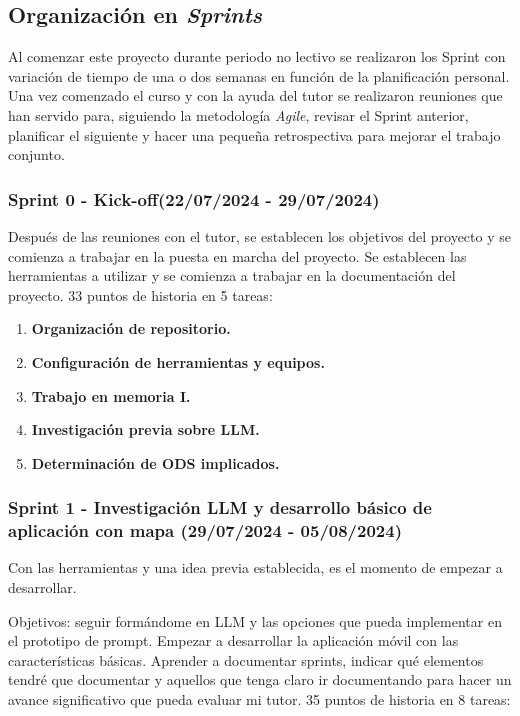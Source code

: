 \subsection{Organización en \textit{Sprints}}

Al comenzar este proyecto durante periodo no lectivo se realizaron los Sprint con variación de tiempo de una o dos semanas en función de la planificación personal. Una vez comenzado el curso y con la ayuda del tutor se realizaron reuniones que han servido para, siguiendo la metodología \textit{Agile}, revisar el Sprint anterior, planificar el siguiente y hacer una pequeña retrospectiva para mejorar el trabajo conjunto.


\subsubsection{Sprint 0 - Kick-off(22/07/2024 - 29/07/2024)}
Después de las reuniones con el tutor, se establecen los objetivos del proyecto y se comienza a trabajar en la puesta en marcha del proyecto. Se establecen las herramientas a utilizar y se comienza a trabajar en la documentación del proyecto. 33 puntos de historia en 5 tareas:
    \begin{enumerate}
    	\item \textbf{Organización de repositorio.}
    	\item \textbf{Configuración de herramientas y equipos.}
    	\item \textbf{Trabajo en memoria I.}
    	\item \textbf{Investigación previa sobre LLM.}
    	\item \textbf{Determinación de ODS implicados.}
    \end{enumerate}
    
    

\subsubsection{Sprint 1 - Investigación LLM y desarrollo básico de aplicación con mapa (29/07/2024 - 05/08/2024)} 
Con las herramientas y una idea previa establecida, es el momento de empezar a desarrollar.
    
    Objetivos: seguir formándome en LLM y las opciones que pueda implementar en el prototipo de prompt.
    Empezar a desarrollar la aplicación móvil con las características básicas.
    Aprender a documentar sprints, indicar qué elementos tendré que documentar y aquellos que tenga claro ir documentando para hacer un avance significativo que pueda evaluar mi tutor. 35 puntos de historia en 8 tareas:
    
